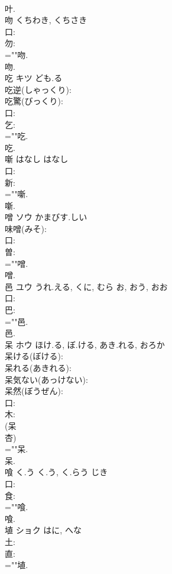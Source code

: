 \documentclass[8pt]{extreport}
\begin{document}
\begin{CJK}{UTF8}{min}
\\	叶.
\\	吻		くちわき, くちさき				
\\	口: 
\\	勿: 
\\	=""吻.
\\	吻.
\\	吃	キツ	ども.る		
\\	吃逆(しゃっくり): 
\\	吃驚(びっくり): 
\\	口: 
\\	乞: 
\\	=""吃.
\\	吃.
\\	噺	はなし	はなし		
\\	口: 
\\	新: 
\\	=""噺.
\\	噺.
\\	噌	ソウ	かまびす.しい		
\\	味噌(みそ): 
\\	口: 
\\	曽: 
\\	=""噌.
\\	噌.
\\	邑	ユウ	うれ.える, くに, むら	お, おう, おお	
\\	口: 
\\	巴: 
\\	=""邑.
\\	邑.
\\	呆	ホウ	ほけ.る, ぼ.ける, あき.れる, おろか		
\\	呆ける(ぼける): 
\\	呆れる(あきれる): 
\\	呆気ない(あっけない): 
\\	呆然(ぼうぜん): 
\\	口: 
\\	木: 
\\	(呆 
\\	杏) 
\\	=""呆.
\\	呆.
\\	喰	く.う	く.う, く.らう	じき	
\\	口: 
\\	食: 
\\	=""喰.
\\	喰.
\\	埴	ショク	はに, へな		
\\	土: 
\\	直: 
\\	=""埴.

\end{CJK}
\end{document}
